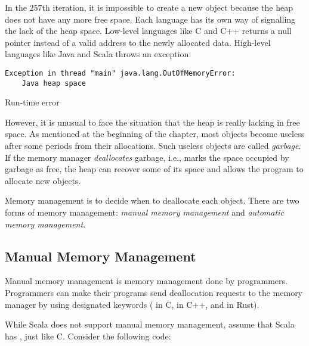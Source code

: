 In the 257th iteration, it is impossible to create a new object because the heap
does not have any more free space. Each language has its own way of signalling
the lack of the heap space. Low-level languages like C and C++ returns a null
pointer instead of a valid address to the newly allocated data. High-level
languages like Java and Scala throws an exception:

\begin{mdframed}[hidealllines=true,backgroundcolor=red!10,innerleftmargin=3pt,innerrightmargin=3pt,leftmargin=-3pt,rightmargin=-3pt]
\begin{verbatim}
Exception in thread "main" java.lang.OutOfMemoryError:
    Java heap space
\end{verbatim}
\vspace{-2em}
\begin{flushright}
\scriptsize\textsf{Run-time error}
\end{flushright}
\end{mdframed}

However, it is unusual to face the situation that the heap is really lacking in
free space. As mentioned at the beginning of the chapter, most objects become
useless after some periods from their allocations. Such useless objects are
called \textit{garbage}. If the memory manager
\textit{deallocates} garbage, i.e., marks the space occupied
by garbage as free, the heap can recover some of its space and allows the
program to allocate new objects.

Memory management is to decide when to deallocate each object.  There are two
forms of memory management: \textit{manual memory management} and \textit{automatic memory management}.

\subsection{Manual Memory Management}

Manual memory management is memory management done by programmers. Programmers
can make their programs send deallocation requests to the memory manager by
using designated keywords
( in C,
 in C++,
and  in Rust).

While Scala does not support manual memory management, assume that Scala has
, just like C. Consider the following code:

